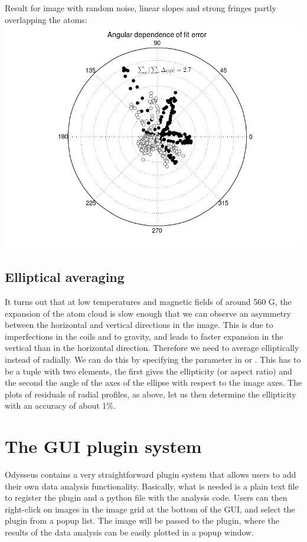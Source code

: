 \documentclass[letterpaper,10pt,english]{manual}
\begin{document}
Result for image with random noise, linear slopes and strong fringes partly overlapping the atoms:
\includegraphics[width=400pt]{raderror_allkindsofnoise.png}

\subsection{Elliptical averaging}

It turns out that at low temperatures and magnetic fields of around 560 G, the expansion of the atom cloud is slow enough that we can observe an asymmetry between the horizontal and vertical directions in the image. This is due to imperfections in the coils and to gravity, and leads to faster expansion in the vertical than in the horizontal direction. Therefore we need to average elliptically instead of radially. We can do this by specifying the  parameter in  or . This has to be a tuple with two elements, the first gives the ellipticity (or aspect ratio) and the second the angle of the axes of the ellipse with respect to the image axes. The plots of residuals of radial profiles, as above, let us then determine the ellipticity with an accuracy of about 1\%.

\resetcurrentobjects


\section{The GUI plugin system}

Odysseus contains a very straightforward plugin system that allows users to add
their own data analysis functionality. Basically, what is needed is a plain text
file to register the plugin and a python file with the analysis code.
Users can then right-click on images in the image grid at the bottom of the GUI,
and select the plugin from a popup list. The image will be passed to the plugin,
where the results of the data analysis can be easily plotted in a popup window.
\end{document}

